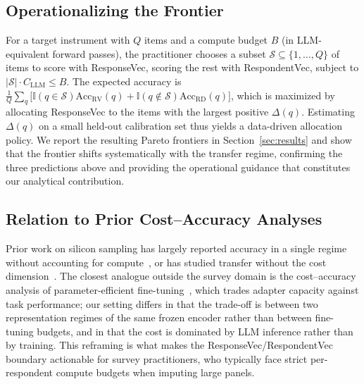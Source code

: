 \subsection{Operationalizing the Frontier}

For a target instrument with $Q$ items and a compute budget $B$ (in LLM-equivalent forward passes), the practitioner chooses a subset $\mathcal{S} \subseteq \{1,\dots,Q\}$ of items to score with ResponseVec, scoring the rest with RespondentVec, subject to $|\mathcal{S}| \cdot C_{\text{LLM}} \le B$. The expected accuracy is $\frac{1}{Q}\sum_q \big[\mathbb{I}(q \in \mathcal{S}) \text{Acc}_{\text{RV}}(q) + \mathbb{I}(q \notin \mathcal{S}) \text{Acc}_{\text{RD}}(q)\big]$, which is maximized by allocating ResponseVec to the items with the largest positive $\Delta(q)$. Estimating $\Delta(q)$ on a small held-out calibration set thus yields a data-driven allocation policy. We report the resulting Pareto frontiers in Section~\ref{sec:results} and show that the frontier shifts systematically with the transfer regime, confirming the three predictions above and providing the operational guidance that constitutes our analytical contribution.

\subsection{Relation to Prior Cost--Accuracy Analyses}

Prior work on silicon sampling has largely reported accuracy in a single regime without accounting for compute~\citep{sun2024random,hu2024quantifying,li2026personabased}, or has studied transfer without the cost dimension~\citep{ku2026silicon}. The closest analogue outside the survey domain is the cost--accuracy analysis of parameter-efficient fine-tuning~\citep{mao2024survey,liu2025shared}, which trades adapter capacity against task performance; our setting differs in that the trade-off is between two representation regimes of the same frozen encoder rather than between fine-tuning budgets, and in that the cost is dominated by LLM inference rather than by training. This reframing is what makes the ResponseVec/RespondentVec boundary actionable for survey practitioners, who typically face strict per-respondent compute budgets when imputing large panels.
